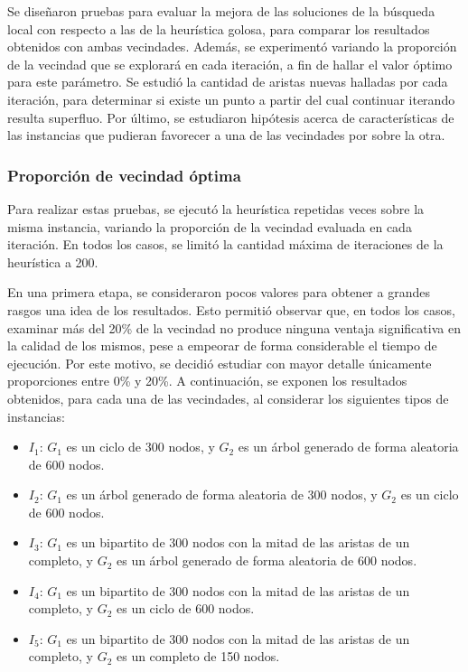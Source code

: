 Se diseñaron pruebas para evaluar la mejora de las soluciones de la búsqueda
local con respecto a las de la heurística golosa, para comparar los resultados
obtenidos con ambas vecindades. Además, se experimentó variando la proporción
de la vecindad que se explorará en cada iteración, a fin de hallar el valor
óptimo para este parámetro. Se estudió la cantidad de aristas nuevas halladas
por cada iteración, para determinar si existe un punto a partir del cual
continuar iterando resulta superfluo. Por último, se estudiaron hipótesis
acerca de características de las instancias que pudieran favorecer a una de las
vecindades por sobre la otra.

\subsubsection{Proporción de vecindad óptima}
Para realizar estas pruebas, se ejecutó la heurística repetidas veces sobre
la misma instancia, variando la proporción de la vecindad evaluada en cada
iteración. En todos los casos, se limitó la cantidad máxima de iteraciones
de la heurística a 200.

En una primera etapa, se consideraron pocos valores para obtener a grandes
rasgos una idea de los resultados. Esto permitió observar que, en todos los
casos, examinar más del 20\% de la vecindad no produce ninguna ventaja
significativa en la calidad de los mismos, pese a empeorar de forma
considerable el tiempo de ejecución. Por este motivo, se decidió estudiar con
mayor detalle únicamente proporciones entre 0\% y 20\%. A continuación, se
exponen los resultados obtenidos, para cada una de las vecindades, al
considerar los siguientes tipos de instancias:

\begin{itemize}
    \item $I_1$: $G_1$ es un ciclo de 300 nodos, y $G_2$ es un árbol generado
    de forma aleatoria de 600 nodos.
    \item $I_2$: $G_1$ es un árbol generado de forma aleatoria de 300 nodos, y
    $G_2$ es un ciclo de 600 nodos.
    \item $I_3$: $G_1$ es un bipartito de 300 nodos con la mitad de las
    aristas de un completo, y $G_2$ es un árbol generado de forma aleatoria de
    600 nodos.
    \item $I_4$: $G_1$ es un bipartito de 300 nodos con la mitad de las
    aristas de un completo, y $G_2$ es un ciclo de 600 nodos.
    \item $I_5$: $G_1$ es un bipartito de 300 nodos con la mitad de las
    aristas de un completo, y $G_2$ es un completo de 150 nodos.
\end{itemize}

